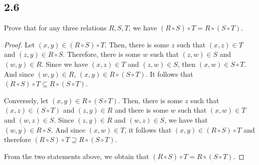 \subsection*{2.6} Prove that for any three relations $R, S, T$, we have $(R \circ S) \circ T = R \circ (S \circ T)$.

\begin{proof}

Let $(x,y) \in (R \circ S) \circ T$. Then, there is some $z$ such that $(x,z) \in T$ and $(z,y) \in R \circ S$. Therefore, there is some $w$ such that $(z, w) \in S$ and $(w, y) \in R$. Since we have $(x,z) \in T$ and $(z, w) \in S$, then $(x,w) \in S \circ T$. And since $(w, y) \in R$, $(x,y) \in R \circ (S \circ T)$. It follows that $(R \circ S) \circ T \subseteq R \circ (S \circ T)$.

Conversely, let $(x,y) \in R \circ (S \circ T)$. Then, there is some $z$ such that $(x,z) \in (S \circ T)$ and $(z, y) \in R$ and there is some $w$ such that $(x,w) \in T$ and $(w, z) \in S$. Since $(z, y) \in R$ and $(w, z) \in S$, we have that $(w,y) \in R \circ S$. And since $(x,w) \in T$, it follows that $(x,y) \in (R \circ S) \circ T$ and therefore $(R \circ S) \circ T \supseteq R \circ (S \circ T)$.

From the two statements above, we obtain that $(R \circ S) \circ T = R \circ (S \circ T)$.
\end{proof}

